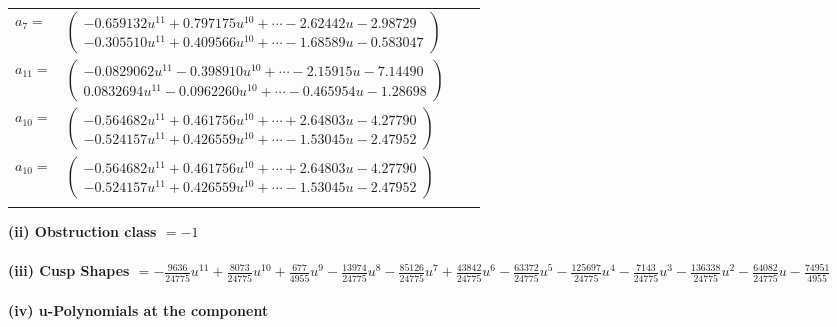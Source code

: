 \documentclass[1p]{elsarticle_modified}
\theoremstyle{definition}
\begin{document}
\begin{tabular}{m{7pt} m{180pt} m{7pt} m{180pt} }
\flushright $a_{7}=$&$\begin{pmatrix}-0.659132 u^{11}+0.797175 u^{10}+\cdots-2.62442 u-2.98729\\-0.305510 u^{11}+0.409566 u^{10}+\cdots-1.68589 u-0.583047\end{pmatrix}$ \\
\flushright $a_{11}=$&$\begin{pmatrix}-0.0829062 u^{11}-0.398910 u^{10}+\cdots-2.15915 u-7.14490\\0.0832694 u^{11}-0.0962260 u^{10}+\cdots-0.465954 u-1.28698\end{pmatrix}$ \\
\flushright $a_{10}=$&$\begin{pmatrix}-0.564682 u^{11}+0.461756 u^{10}+\cdots+2.64803 u-4.27790\\-0.524157 u^{11}+0.426559 u^{10}+\cdots-1.53045 u-2.47952\end{pmatrix}$\\ \flushright $a_{10}=$&$\begin{pmatrix}-0.564682 u^{11}+0.461756 u^{10}+\cdots+2.64803 u-4.27790\\-0.524157 u^{11}+0.426559 u^{10}+\cdots-1.53045 u-2.47952\end{pmatrix}$\\&\end{tabular}
\flushleft \textbf{(ii) Obstruction class $= -1$}\\~\\
\flushleft \textbf{(iii) Cusp Shapes $= -\frac{9636}{24775} u^{11}+\frac{8073}{24775} u^{10}+\frac{677}{4955} u^9-\frac{13974}{24775} u^8-\frac{85126}{24775} u^7+\frac{43842}{24775} u^6-\frac{63372}{24775} u^5-\frac{125697}{24775} u^4-\frac{7143}{24775} u^3-\frac{136338}{24775} u^2-\frac{64082}{24775} u-\frac{74951}{4955}$}\\~\\
\newpage\renewcommand{\arraystretch}{1}
\flushleft \textbf{(iv) u-Polynomials at the component}\newline \\
\end{document}
